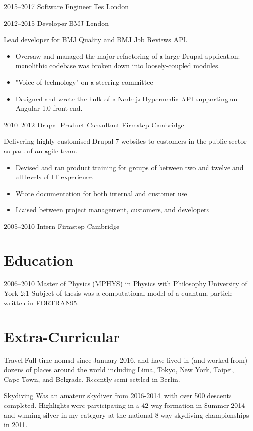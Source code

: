 \documentclass[10pt,a4paper,sans]{moderncv}
\begin{document}
\cventry
  {2015--2017}
  {Software Engineer}
  {Tes}
  {London}
  {}
  {}

\cventry
  {2012--2015}
  {Developer}
  {BMJ}
  {London}
  {}
  {
    Lead developer for BMJ Quality and BMJ Job Reviews API.
    \begin{itemize}
      \item Oversaw and managed the major refactoring of a large Drupal application: monolithic codebase was broken down into loosely-coupled modules.
      \item "Voice of technology" on a steering committee
      \item Designed and wrote the bulk of a Node.js Hypermedia API supporting an Angular 1.0 front-end.
    \end{itemize}
  }

\cventry
  {2010--2012}
  {Drupal Product Consultant}
  {Firmstep}
  {Cambridge}
  {}
  {
    Delivering highly customised Drupal 7 websites to customers in the public sector as part of an agile team.
    \begin{itemize}
      \item Devised and ran product training for groups of between two and twelve and all levels of IT experience.
      \item Wrote documentation for both internal and customer use
      \item Liaised between project management, customers, and developers
    \end{itemize}
  }

\cventry
  {2005--2010}
  {Intern}
  {Firmstep}
  {Cambridge}
  {}
  {}

\section{Education}

\cventry
  {2006--2010}
  {Master of Physics (\small{MPHYS}) in Physics with Philosophy}
  {University of York}
  {}
  {2:1}
  {
    Subject of thesis was a computational model of a quantum particle written in FORTRAN95.
  }

\section{Extra-Curricular}

\cvitem
  {Travel}
  {
    Full-time nomad since January 2016, and have lived in (and worked from) dozens of places around the world including Lima, Tokyo, New York, Taipei, Cape Town, and Belgrade. Recently semi-settled in Berlin.
  }

\cvitem
  {Skydiving}
  {
    Was an amateur skydiver from 2006-2014, with over 500 descents completed. Highlights were participating in a 42-way formation in Summer 2014 and winning silver in my category at the national 8-way skydiving championships in 2011.
  }
\end{document}
